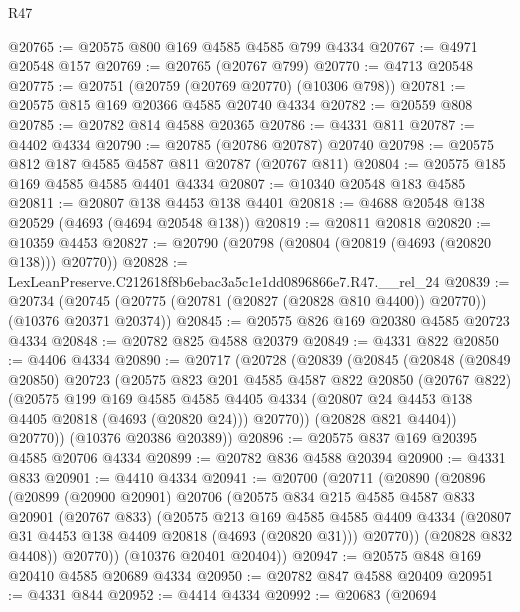 \begin{lexlean}{R47}
\begin{coremodule}
@20765 := @20575 @800 @169 @4585 @4585 @799 @4334
@20767 := @4971 @20548 @157
@20769 := @20765 (@20767 @799)
@20770 := @4713 @20548
@20775 := @20751 (@20759 (@20769 @20770) (@10306 @798))
@20781 := @20575 @815 @169 @20366 @4585 @20740 @4334
@20782 := @20559 @808
@20785 := @20782 @814 @4588 @20365
@20786 := @4331 @811
@20787 := @4402 @4334
@20790 := @20785 (@20786 @20787) @20740
@20798 := @20575 @812 @187 @4585 @4587 @811 @20787 (@20767 @811)
@20804 := @20575 @185 @169 @4585 @4585 @4401 @4334
@20807 := @10340 @20548 @183 @4585
@20811 := @20807 @138 @4453 @138 @4401
@20818 := @4688 @20548 @138 @20529 (@4693 (@4694 @20548 @138))
@20819 := @20811 @20818
@20820 := @10359 @4453
@20827 := @20790 (@20798 (@20804 (@20819 (@4693 (@20820 @138))) @20770))
@20828 := LexLeanPreserve.C212618f8b6ebac3a5c1e1dd0896866e7.R47.__rel_24
@20839 := @20734
    (@20745 (@20775 (@20781 (@20827 (@20828 @810 @4400)) @20770)) (@10376 @20371 @20374))
@20845 := @20575 @826 @169 @20380 @4585 @20723 @4334
@20848 := @20782 @825 @4588 @20379
@20849 := @4331 @822
@20850 := @4406 @4334
@20890 := @20717
    (@20728
      (@20839
        (@20845
          (@20848
            (@20849 @20850)
            @20723
            (@20575
              @823
              @201
              @4585
              @4587
              @822
              @20850
              (@20767 @822)
              (@20575
                @199
                @169
                @4585
                @4585
                @4405
                @4334
                (@20807 @24 @4453 @138 @4405 @20818 (@4693 (@20820 @24)))
                @20770))
            (@20828 @821 @4404))
          @20770))
      (@10376 @20386 @20389))
@20896 := @20575 @837 @169 @20395 @4585 @20706 @4334
@20899 := @20782 @836 @4588 @20394
@20900 := @4331 @833
@20901 := @4410 @4334
@20941 := @20700
    (@20711
      (@20890
        (@20896
          (@20899
            (@20900 @20901)
            @20706
            (@20575
              @834
              @215
              @4585
              @4587
              @833
              @20901
              (@20767 @833)
              (@20575
                @213
                @169
                @4585
                @4585
                @4409
                @4334
                (@20807 @31 @4453 @138 @4409 @20818 (@4693 (@20820 @31)))
                @20770))
            (@20828 @832 @4408))
          @20770))
      (@10376 @20401 @20404))
@20947 := @20575 @848 @169 @20410 @4585 @20689 @4334
@20950 := @20782 @847 @4588 @20409
@20951 := @4331 @844
@20952 := @4414 @4334
@20992 := @20683
    (@20694

\end{coremodule}
\end{lexlean}
